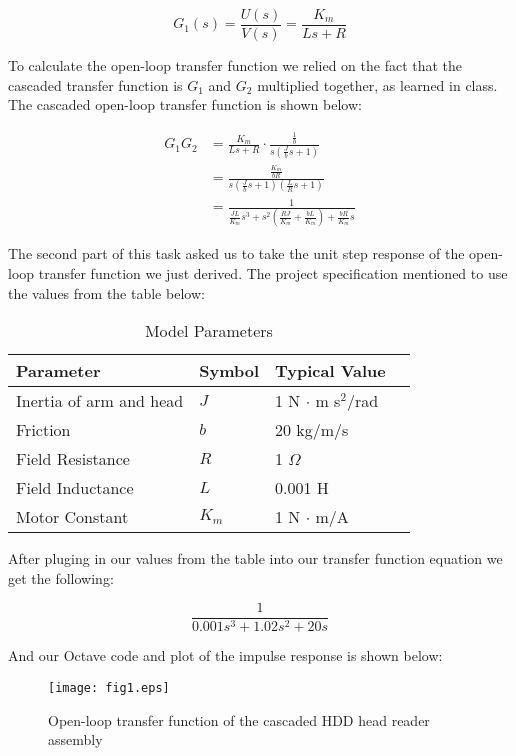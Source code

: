 \documentclass{article}
\newcommand{\matlab}[1]{%
%
}
\begin{document}
$$G_1(s) = \frac{U(s)}{V(s)} = \frac{K_m}{Ls + R}$$

To calculate the open-loop transfer function we relied on the fact
that the cascaded transfer function is $G_1$ and $G_2$ multiplied
together, as learned in class. The cascaded open-loop transfer
function is shown below:

\begin{align*}
  G_1G_2 &= \frac{K_m}{Ls+R} \cdot \frac{\frac{1}{b}}{s(\frac{J}{b}s + 1)} \\
         &= \frac{\frac{K_m}{bR}}{s\left(\frac{J}{b}s + 1\right)  
		 \left(\frac{L}{R}s + 1\right)} \\
         &= \frac{1}{\frac{JL}{K_m}s^3 + s^2\left( \frac{RJ}{K_m} + 
		 \frac{bL}{K_m} \right) + \frac{bR}{K_m}s}
\end{align*}

The second part of this task asked us to take the unit step response
of the open-loop transfer function we just derived. The project
specification mentioned to use the values from the table below:

\begin{table}[H]
  \begin{center}
    \begin{tabular}{ | l | l | l | p{5cm} |}
    \hline
    \textbf{Parameter} & \textbf{Symbol} & \textbf{Typical Value} \\ \hline
    Inertia of arm and head & $J$ & 1 N $\cdot$ m s$^2$/rad \\ \hline 
    Friction & $b$ & 20 kg/m/s \\ \hline
    Field Resistance & $R$ & 1 $\Omega$ \\ \hline
    Field Inductance & $L$ & 0.001 H \\ \hline
    Motor Constant & $K_m$ & 1 N $\cdot$ m/A \\ \hline
   \end{tabular}
 \end{center}
 \caption{Model Parameters}
\end{table}

After pluging in our values from the table into our transfer function
equation we get the following:

$$\frac{1}{0.001s^3 + 1.02 s^2 + 20s}$$

And our Octave code and plot of the impulse response is shown below:

\matlab{fig1.m}

\begin{figure}[H]
  \caption{Open-loop transfer function of the cascaded HDD head reader
    assembly}
  \centering
  \texttt{[image: fig1.eps]}
\end{figure}
\end{document}
